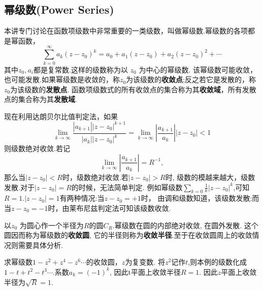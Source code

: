 \subsection{幂级数(Power Series)}
本讲专门讨论在函数项级数中非常重要的一类级数，叫做幂级数.幂级数的各项都是幂函数，
\begin{equation}
    \sum_{k=0}^{\infty} a_k\left(z-z_0\right)^k=a_0+a_1\left(z-z_0\right)+a_2\left(z-z_0\right)^2+\cdots
\end{equation}
其中$z_0, a_i$都是复常数.这样的级数称为以 $z_0$ 为中心的幂级数.
该幂级数可能收敛，也可能发散.如果幂级数是收敛的，称$z_0$为该级数的\textbf{收敛点};反之若它是发散的，称$z_0$为该级数的\textbf{发散点}.
函数项级数式的所有收敛点的集合称为其\textbf{收敛域}，所有发散点的集合称为其\textbf{发散域}.

现在利用达朗贝尔比值判定法，如果
\begin{equation}
    \lim _{k \rightarrow \infty} \frac{\left|a_{k+1}\right|\left|z-z_0\right|^{k+1}}{\left|a_k\right|\left|z-z_0\right|^k}
    =\lim _{k \rightarrow \infty}\left|\frac{a_{k+1}}{a_k}\right|\left|z-z_0\right|<1
\end{equation}
则级数绝对收敛.若记
\begin{equation}
    \lim_{k \rightarrow \infty} \left|\frac{a_{k+1}}{a_k}\right| = R^{-1},
\end{equation}
那么当$|z-z_0| < R$时，级数绝对收敛.若$|z-z_0| > R$时, 级数的模越来越大，级数发散.对于$|z-z_0| = R$的时候，无法简单判定.
例如幂级数$\sum_{k=0} \frac{1}{k} |z-z_0|^k$,可知$R=1$.$|z-z_0|=1$有两种情况:当$z-z_0 = +1$时， 由调和级数知道，该级数发散;而
当$z-z_0 = -1$时，由莱布尼兹判定法可知该级数收敛.

以$z_0$ 为圆心作一个半径为$R$的圆$C_R$.幂级数在圆的内部绝对收敛, 在圆外发散. 这个圆因而称为幂级数的\textbf{收敛圆}, 
它的半径则称为\textbf{收敛半径}.至于在收敛圆周上的收敛情况则需要具体分析.

\begin{examplebox}{求幂级数$1 - z^2 + z^4 - z^6\cdots$的收敛圆，$z$为复变数.}
    将$z^2$记作$t$,则本例的级数化成$1-t + t^2 - t^3\cdots$.系数$a_k =(-1)^k$, 因此t平面上收敛半径$R=1$. 
    因此$z$平面上收敛半径为$\sqrt{R}=1$.
\end{examplebox}

